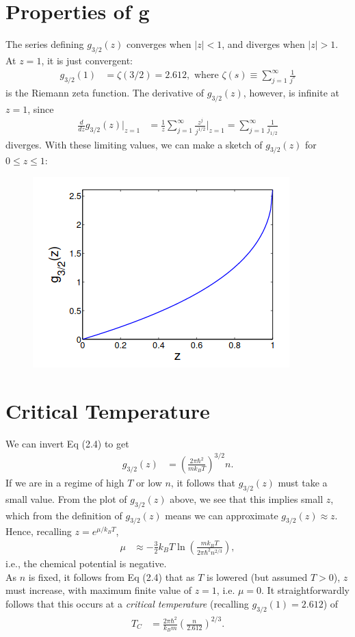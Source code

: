 \documentclass[qo.tex]{subfiles}
\begin{document}
\section{Properties of g}
The series defining $g_{3/2}(z)$ converges when $|z|<1$, and diverges when $|z|>1$.
At $z=1$, it is just convergent:
\begin{align}
    g_{3/2}(1) &= \zeta(3/2) = 2.612, \text{ where } \zeta(s) \equiv \sum_{j=1}^\infty \frac{1}{j^s}
\end{align}
is the Riemann zeta function.
The derivative of $g_{3/2}(z)$, however, is infinite at $z=1$, since
\begin{align}
    \frac{d}{dz}g_{3/2}(z)\bigg|_{z=1} &= \frac{1}{z}\sum_{j=1}^\infty \frac{z^j}{j^{1/2}}\bigg|_{z=1} = \sum_{j=1}^\infty \frac{1}{j_{1/2}}
\end{align}
diverges.
With these limiting values, we can make a sketch of $g_{3/2}(z)$ for $0\leq z\leq1$:
\begin{figure}[H]
    \centering
    \includegraphics[scale=0.7]{g32.png}
\end{figure}

\section{Critical Temperature}
We can invert Eq (2.4) to get 
\begin{align}
    g_{3/2}(z) &= \left(\frac{2\pi\hbar^2}{mk_BT}\right)^{3/2}n.
\end{align}
If we are in a regime of high $T$ or low $n$, it follows that $g_{3/2}(z)$ must take a small value.
From the plot of $g_{3/2}(z)$ above, we see that this implies small $z$, which from the definition of $g_{3/2}(z)$ means we can approximate $g_{3/2}(z)\approx z$. 
Hence, recalling $z=e^{\mu/k_BT}$,
\begin{align}
    \mu &\approx -\frac32 k_BT\ln\left(\frac{mk_BT}{2\pi\hbar^2n^{2/3}}\right),
\end{align}
i.e., the chemical potential is negative. \\
As $n$ is fixed, it follows from Eq (2.4) that as $T$ is lowered (but assumed $T>0$), $z$ must increase, with maximum finite value of $z=1$, i.e. $\mu=0$.
It straightforwardly follows that this occurs at a \emph{critical temperature} (recalling $g_{3/2}(1)=2.612$) of 
\begin{align}
    T_C &= \frac{2\pi\hbar^2}{k_Bm}\left(\frac{n}{2.612}\right)^{2/3}.
\end{align}
\end{document}
